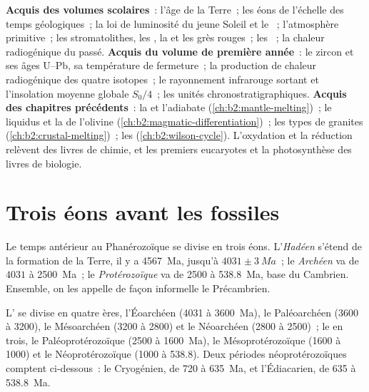 \begin{recall}
\textbf{Acquis des volumes scolaires}~: l'âge de la Terre~; les éons de l'échelle des temps géologiques~;
la loi de luminosité du jeune Soleil et le ~; l'atmosphère primitive~;
les stromatolithes, les , la  et les grès rouges~; les ~;
la chaleur radiogénique du passé. \textbf{Acquis du volume de première année}~: le zircon et ses âges U--Pb,
sa température de fermeture~; la production de chaleur radiogénique des quatre isotopes~; le rayonnement
infrarouge sortant et l'insolation moyenne globale $S_0/4$~; les unités chronostratigraphiques.
\textbf{Acquis des chapitres précédents}~: la  et l'adiabate
(\cref{ch:b2:mantle-melting})~; le liquidus et la  de l'olivine
(\cref{ch:b2:magmatic-differentiation})~; les types de granites (\cref{ch:b2:crustal-melting})~;
les  (\cref{ch:b2:wilson-cycle}). L'oxydation et la réduction relèvent des livres de chimie,
et les premiers eucaryotes et la photosynthèse des livres de biologie.
\end{recall}

\section{Trois éons avant les fossiles}\label{sec:b2:precambrian-earth:eons}

\begin{definition}\label{def:b2:precambrian-earth:eons}
Le temps antérieur au Phanérozoïque se divise en trois éons. L'\emph{Hadéen}
s'étend de la formation de la Terre, il y a \qty{4567}{Ma}, jusqu'à $4031 \pm \qty{3}{Ma}$~; le
\emph{Archéen} va de $4031$ à \qty{2500}{Ma}~; le
\emph{Protérozoïque} va de 2500 à \qty{538.8}{Ma}, base du Cambrien.
Ensemble, on les appelle de façon informelle le Précambrien.
\end{definition}

L' se divise en quatre ères, l'Éoarchéen (4031 à \qty{3600}{Ma}), le Paléoarchéen (3600
à 3200), le Mésoarchéen (3200 à 2800) et le Néoarchéen (2800 à 2500)~; le  en trois,
le Paléoprotérozoïque (2500 à \qty{1600}{Ma}), le Mésoprotérozoïque (1600 à 1000) et
le Néoprotérozoïque (1000 à 538.8). Deux périodes néoprotérozoïques comptent ci-dessous~: le Cryogénien, de 720 à
\qty{635}{Ma}, et l'Édiacarien, de 635 à \qty{538.8}{Ma}.

